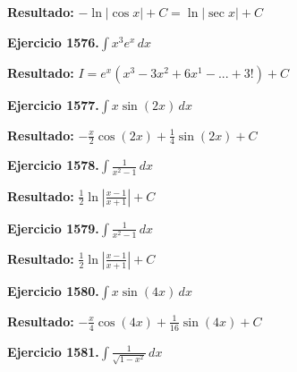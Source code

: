 \documentclass[10pt,a4paper]{article}
\begin{document}
\begin{solbox}
\textbf{Resultado:} \(\displaystyle -\ln|\cos x| + C = \ln|\sec x| + C\)
\end{solbox}

\newpage
\begin{ejbox}
\textbf{Ejercicio 1576.}\quad $\int x^{3} e^x\,dx$
\end{ejbox}

\begin{solbox}
\textbf{Resultado:} \(\displaystyle I = e^x(x^{3} - 3x^{2} + 6x^{1} - ... + 3!) + C\)
\end{solbox}

\begin{ejbox}
\textbf{Ejercicio 1577.}\quad $\int x \sin(2x)\,dx$
\end{ejbox}

\begin{solbox}
\textbf{Resultado:} \(\displaystyle -\frac{x}{2}\cos(2x) + \frac{1}{4}\sin(2x) + C\)
\end{solbox}

\begin{ejbox}
\textbf{Ejercicio 1578.}\quad $\int \frac{1}{x^2-1}\,dx$
\end{ejbox}

\begin{solbox}
\textbf{Resultado:} \(\displaystyle \frac{1}{2}\ln\left|\frac{x-1}{x+1}\right| + C\)
\end{solbox}

\newpage
\begin{ejbox}
\textbf{Ejercicio 1579.}\quad $\int \frac{1}{x^2-1}\,dx$
\end{ejbox}

\begin{solbox}
\textbf{Resultado:} \(\displaystyle \frac{1}{2}\ln\left|\frac{x-1}{x+1}\right| + C\)
\end{solbox}

\begin{ejbox}
\textbf{Ejercicio 1580.}\quad $\int x \sin(4x)\,dx$
\end{ejbox}

\begin{solbox}
\textbf{Resultado:} \(\displaystyle -\frac{x}{4}\cos(4x) + \frac{1}{16}\sin(4x) + C\)
\end{solbox}

\begin{ejbox}
\textbf{Ejercicio 1581.}\quad $\int \frac{1}{\sqrt{1-x^2}}\,dx$
\end{ejbox}
\end{document}
